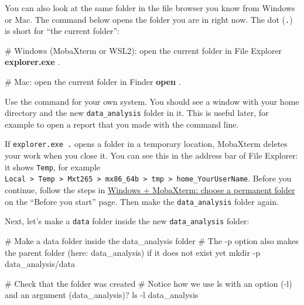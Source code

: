 \documentclass[
  letterpaper,
  DIV=11,
  numbers=noendperiod]{scrreprt}
\newenvironment{Shaded}{}{}
\newcommand{\AttributeTok}[1]{\textcolor[rgb]{0.84,0.23,0.29}{#1}}
\newcommand{\CommentTok}[1]{\textcolor[rgb]{0.42,0.45,0.49}{#1}}
\newcommand{\ExtensionTok}[1]{\textcolor[rgb]{0.84,0.23,0.29}{\textbf{#1}}}
\newcommand{\FunctionTok}[1]{\textcolor[rgb]{0.44,0.26,0.76}{#1}}
\newcommand{\NormalTok}[1]{\textcolor[rgb]{0.14,0.16,0.18}{#1}}
\begin{document}
You can also look at the same folder in the file browser you know from
Windows or Mac. The command below opens the folder you are in right now.
The dot (\texttt{.}) is short for ``the current folder'':

\begin{Shaded}
\begin{Highlighting}[]
\CommentTok{\# Windows (MobaXterm or WSL2): open the current folder in File Explorer}
\ExtensionTok{explorer.exe}\NormalTok{ .}

\CommentTok{\# Mac: open the current folder in Finder}
\ExtensionTok{open}\NormalTok{ .}
\end{Highlighting}
\end{Shaded}

Use the command for your own system. You should see a window with your
home directory and the new \texttt{data\_analysis} folder in it. This is
useful later, for example to open a report that you made with the
command line.

\begin{tcolorbox}[enhanced jigsaw, coltitle=black, breakable, titlerule=0mm, colback=white, rightrule=.15mm, bottomrule=.15mm, toprule=.15mm, colframe=quarto-callout-important-color-frame, colbacktitle=quarto-callout-important-color!10!white, bottomtitle=1mm, opacitybacktitle=0.6, toptitle=1mm, leftrule=.75mm, arc=.35mm, title=\textcolor{quarto-callout-important-color}{\faExclamation}\hspace{0.5em}{MobaXterm users: did you choose a permanent folder?}, left=2mm, opacityback=0]

If \texttt{explorer.exe\ .} opens a folder in a temporary location,
MobaXterm deletes your work when you close it. You can see this in the
address bar of File Explorer: it shows \texttt{Temp}, for example
\texttt{Local\ \textgreater{}\ Temp\ \textgreater{}\ Mxt265\ \textgreater{}\ mx86\_64b\ \textgreater{}\ tmp\ \textgreater{}\ home\_YourUserName}.
Before you continue, follow the steps in
\href{installation.qmd\#windows-mobaxterm-choose-a-permanent-folder}{Windows
+ MobaXterm: choose a permanent folder} on the ``Before you start''
page. Then make the \texttt{data\_analysis} folder again.

\end{tcolorbox}

Next, let's make a \texttt{data} folder inside the new
\texttt{data\_analysis} folder:

\begin{Shaded}
\begin{Highlighting}[]
\CommentTok{\# Make a data folder inside the data\_analysis folder}
\CommentTok{\# The {-}p option also makes the parent folder (here: data\_analysis) if it does not exist yet}
\FunctionTok{mkdir} \AttributeTok{{-}p}\NormalTok{ data\_analysis/data}

\CommentTok{\# Check that the folder was created}
\CommentTok{\# Notice how we use ls with an option ({-}l) and an argument (data\_analysis)?}
\FunctionTok{ls} \AttributeTok{{-}l}\NormalTok{ data\_analysis}
\end{Highlighting}
\end{Shaded}
\end{document}
